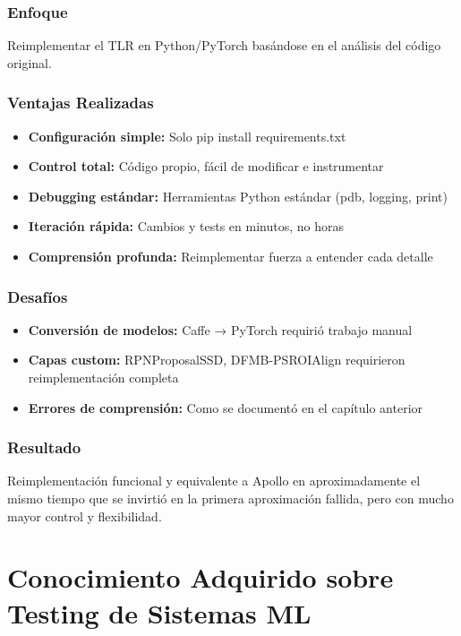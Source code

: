 \subsubsection{Enfoque}

Reimplementar el TLR en Python/PyTorch basándose en el análisis del código original.

\subsubsection{Ventajas Realizadas}

\begin{itemize}
    \item \textbf{Configuración simple:} Solo pip install requirements.txt
    \item \textbf{Control total:} Código propio, fácil de modificar e instrumentar
    \item \textbf{Debugging estándar:} Herramientas Python estándar (pdb, logging, print)
    \item \textbf{Iteración rápida:} Cambios y tests en minutos, no horas
    \item \textbf{Comprensión profunda:} Reimplementar fuerza a entender cada detalle
\end{itemize}

\subsubsection{Desafíos}

\begin{itemize}
    \item \textbf{Conversión de modelos:} Caffe → PyTorch requirió trabajo manual
    \item \textbf{Capas custom:} RPNProposalSSD, DFMB-PSROIAlign requirieron reimplementación completa
    \item \textbf{Errores de comprensión:} Como se documentó en el capítulo anterior
\end{itemize}

\subsubsection{Resultado}

Reimplementación funcional y equivalente a Apollo en aproximadamente el mismo tiempo que se invirtió en la primera aproximación fallida, pero con mucho mayor control y flexibilidad.

\section{Conocimiento Adquirido sobre Testing de Sistemas ML}

